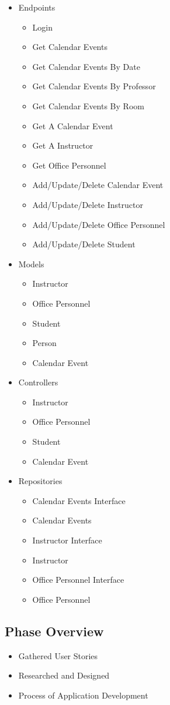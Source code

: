 \begin{itemize}
\item Endpoints
\begin{itemize}
\item Login
\item Get Calendar Events
\item Get Calendar Events By Date
\item Get Calendar Events By Professor
\item Get Calendar Events By Room
\item Get A Calendar Event
\item Get A Instructor
\item Get Office Personnel
\item Add/Update/Delete Calendar Event
\item Add/Update/Delete Instructor
\item Add/Update/Delete Office Personnel
\item Add/Update/Delete Student
\end{itemize}
\item Models
\begin{itemize}
\item Instructor
\item Office Personnel
\item Student
\item Person
\item Calendar Event
\end{itemize}
\item Controllers
\begin{itemize}
\item Instructor
\item Office Personnel
\item Student
\item Calendar Event
\end{itemize}
\item Repositories
\begin{itemize}
\item Calendar Events Interface
\item Calendar Events
\item Instructor Interface
\item Instructor
\item Office Personnel Interface
\item Office Personnel 
\end{itemize}
\end{itemize}

\subsection{Phase Overview}
\begin{itemize}
\item Gathered User Stories
\item Researched and Designed
\item Process of Application Development
\end{itemize}

